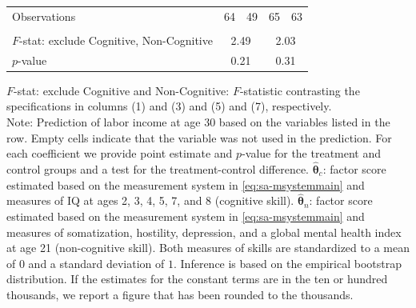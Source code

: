 \documentclass[static]{JJH-Beamer}
\begin{document}
\begin{frame}
\begin{table}[H]
\begin{center}
{\begin{tabular}{lcccccccc}
Observations &         \multicolumn{2}{c}{64} &         \multicolumn{2}{c}{49} &                \multicolumn{2}{c}{65} &       \multicolumn{2}{c}{63}  \\   \\ \midrule
$F$-stat: exclude Cognitive, Non-Cognitive &             \multicolumn{4}{c}{2.49} &              \multicolumn{4}{c}{2.03}  \\
$p$-value &                 \multicolumn{4}{c}{0.21} &                   \multicolumn{4}{c}{0.31}  \\
\bottomrule
\end{tabular}
}
\end{center}
\tiny \flushleft
$F$-stat: exclude Cognitive and Non-Cognitive: $F$-statistic contrasting the specifications in columns (1) and (3) and (5) and (7), respectively.\\
Note: Prediction of labor income at age 30 based on the variables listed in the row. Empty cells indicate that the variable was not used in the prediction. For each coefficient we provide point estimate and $p$-value for the treatment and control groups and a test for the treatment-control difference. $\hat{\bm{\theta}}_{c}$: factor score estimated based on the measurement system in \eqref{eq:sa-msystemmain} and measures of IQ at ages 2, 3, 4, 5, 7, and 8 (cognitive skill). $\hat{\bm{\theta}}_{n}$: factor score estimated based on the measurement system in \eqref{eq:sa-msystemmain} and measures of somatization, hostility, depression, and a global mental health index at age 21 (non-cognitive skill). Both measures of skills are standardized to a mean of $0$ and a standard deviation of $1$. Inference is based on the empirical bootstrap distribution. If the estimates for the constant terms are in the ten or hundred thousands, we report a figure that has been rounded to the thousands.\\
\end{table}

\end{frame}
\end{document}
